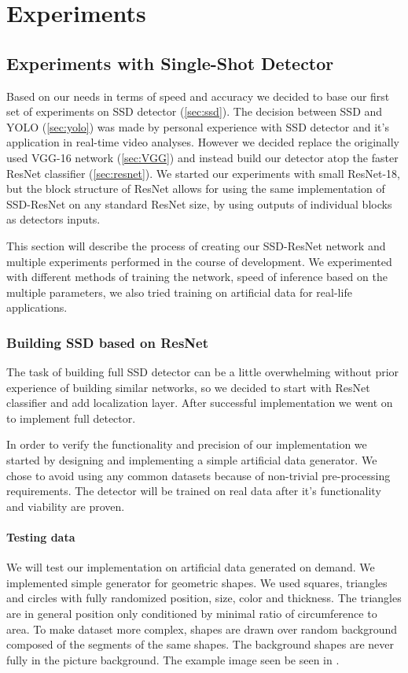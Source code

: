 \chapter{Experiments}
\section{Experiments with Single-Shot Detector}
\label{chapt:experiments}
Based on our needs in terms of speed and accuracy we decided to base our first set of experiments on SSD detector (\cref{sec:ssd}). The decision between SSD and YOLO (\cref{sec:yolo}) was made by personal experience with SSD detector and it's application in real-time video analyses. However we decided replace the originally used VGG-16 network (\cref{sec:VGG}) and instead build our detector atop the faster ResNet classifier (\cref{sec:resnet}). We started our experiments with small ResNet-18, but the block structure of ResNet allows for using the same implementation of SSD-ResNet on any standard ResNet size, by using outputs of individual blocks as detectors inputs.

This section will describe the process of creating our SSD-ResNet network and multiple experiments performed in the course of development. We experimented with different methods of training the network, speed of inference based on the multiple parameters, we also tried training on artificial data for real-life applications.


\subsection{Building SSD based on ResNet}
The task of building full SSD detector can be a little overwhelming without prior experience of building similar networks, so we decided to start with ResNet classifier and add localization layer. After successful implementation we went on to implement full detector. 

In order to verify the functionality and precision of our implementation we started by designing and implementing a simple artificial data generator. We chose to avoid using any common datasets because of non-trivial pre-processing requirements. The detector will be trained on real data after it's functionality and viability are proven.

\subsubsection{Testing data}
We will test our implementation on artificial data generated on demand. We implemented simple generator for geometric shapes. We used squares, triangles and circles with fully randomized position, size, color and thickness. The triangles are in general position only conditioned by minimal ratio of circumference to area.
To make dataset more complex, shapes are drawn over random background composed of the segments of the same shapes. The background shapes are never fully in the picture background. The example image seen be seen in .



